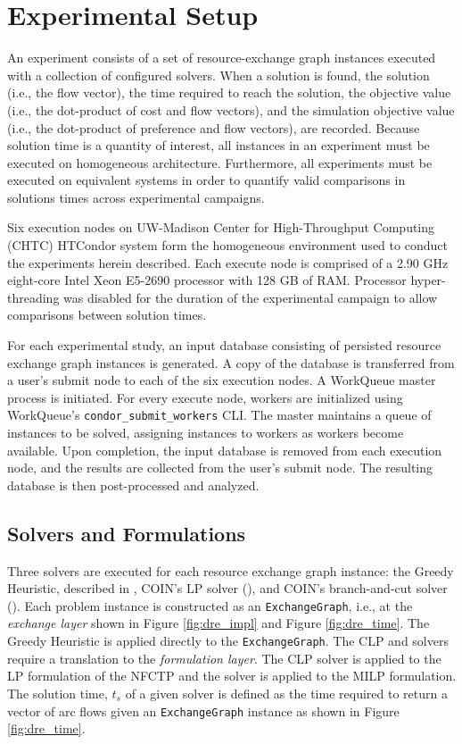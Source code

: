 
\section{Experimental Setup}\label{results:setup}

An experiment consists of a set of resource-exchange graph instances executed
with a collection of configured solvers. When a solution is found, the solution
(i.e., the flow vector), the time required to reach the solution, the objective
value (i.e., the dot-product of cost and flow vectors), and the simulation
objective value (i.e., the dot-product of preference and flow vectors), are
recorded. Because solution time is a quantity of interest, all instances in an
experiment must be executed on homogeneous architecture. Furthermore, all
experiments must be executed on equivalent systems in order to quantify valid
comparisons in solutions times across experimental campaigns.

Six execution nodes on UW-Madison Center for High-Throughput Computing (CHTC)
HTCondor system form the homogeneous environment used to conduct the experiments
herein described. Each execute node is comprised of a 2.90 GHz eight-core Intel
Xeon E5-2690 \cite{intelproc} processor with 128 GB of RAM. Processor
hyper-threading was disabled for the duration of the experimental campaign to
allow comparisons between solution times.

For each experimental study, an input database consisting of persisted resource
exchange graph instances is generated. A copy of the database is transferred
from a user's submit node to each of the six execution nodes. A WorkQueue master
process is initiated. For every execute node, workers are initialized using
WorkQueue's \texttt{condor\_submit\_workers} CLI. The master maintains a queue
of instances to be solved, assigning instances to workers as workers become
available. Upon completion, the input database is removed from each execution
node, and the results are collected from the user's submit node. The resulting
database is then post-processed and analyzed.

\subsection{Solvers and Formulations}

Three solvers are executed for each resource exchange graph instance: the Greedy
Heuristic, described in , COIN's LP solver
(\clp), and COIN's branch-and-cut solver (\cbc). Each problem instance
is constructed as an \texttt{ExchangeGraph}, i.e., at the \textit{exchange
  layer} shown in Figure \ref{fig:dre_impl} and Figure \ref{fig:dre_time}. The
Greedy Heuristic is applied directly to the \texttt{ExchangeGraph}. The CLP and
\cbc solvers require a translation to the \textit{formulation layer}. The CLP
solver is applied to the LP formulation of the NFCTP and the \cbc solver is
applied to the MILP formulation. The solution time, $t_s$ of a given solver is
defined as the time required to return a vector of arc flows given an
\texttt{ExchangeGraph} instance as shown in Figure \ref{fig:dre_time}.


